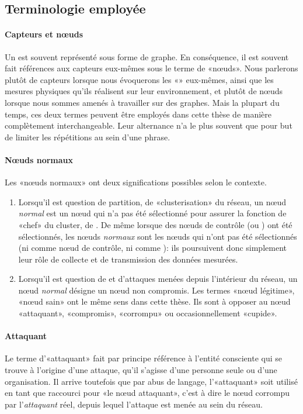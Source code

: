     \subsection{Terminologie employée}
            \paragraph{Capteurs et nœuds}
Un \rcsf est souvent représenté sous forme de graphe.
En conséquence, il est souvent fait références aux capteurs eux-mêmes sous le terme de «nœuds».
Nous parlerons plutôt de capteurs lorsque nous évoquerons les «\rcs» eux-mêmes, ainsi que les mesures physiques qu'ils réalisent sur leur environnement, et plutôt de nœuds lorsque nous sommes amenés à travailler sur des graphes.
Mais la plupart du temps, ces deux termes peuvent être employés dans cette thèse de manière complètement interchangeable.
Leur alternance n'a le plus souvent que pour but de limiter les répétitions au sein d'une phrase.

            \paragraph{Nœuds normaux}
Les «nœuds normaux» ont deux significations possibles selon le contexte.
\begin{enumerate}
    \item Lorsqu'il est question de partition, de «clusterisation» du réseau, un nœud \textit{normal} est un nœud qui n'a pas été sélectionné pour assurer la fonction de «chef» du cluster, de \ch. De même lorsque des nœuds de contrôle (\cns ou \vns) ont été sélectionnés, les nœuds \textit{normaux} sont les nœuds qui n'ont pas été sélectionnés (ni comme nœud de contrôle, ni comme \ch): ils poursuivent donc simplement leur rôle de collecte et de transmission des données mesurées.
    \item Lorsqu'il est question de \secu et d'attaques menées depuis l'intérieur du réseau, un nœud \textit{normal} désigne un nœud non compromis. Les termes «nœud légitime», «nœud sain» ont le même sens dans cette thèse. Ils sont à opposer au nœud «attaquant», «compromis», «corrompu» ou occasionnellement «cupide».
\end{enumerate}

            \paragraph{Attaquant}
Le terme d'«attaquant» fait par principe référence à l'entité consciente qui se trouve à l'origine d'une attaque, qu'il s'agisse d'une personne seule ou d'une organisation.
Il arrive toutefois que par abus de langage, l'«attaquant» soit utilisé en tant que raccourci pour «le nœud attaquant», c'est à dire le nœud corrompu par l'\textit{attaquant} réel, depuis lequel l'attaque est menée au sein du réseau.

